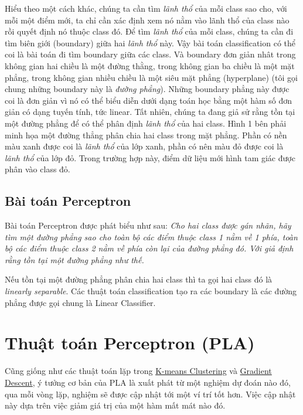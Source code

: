 Hiểu theo một cách khác, chúng ta cần tìm \textit{lãnh thổ} của mỗi class sao cho, với mỗi một điểm mới, ta chỉ cần xác định xem nó nằm vào lãnh thổ của class nào rồi quyết định nó thuộc class đó. Để tìm \textit{lãnh thổ} của mỗi class, chúng ta cần đi tìm biên giới (boundary) giữa hai \textit{lãnh thổ} này. Vậy bài toán classification có thể coi là bài toán đi tìm boundary giữa các class. Và boundary đơn giản nhât trong không gian hai chiều là một đường thằng, trong không gian ba chiều là một mặt phẳng, trong không gian nhiều chiều là một siêu mặt phẳng (hyperplane) (tôi gọi chung những boundary này là \textit{đường phẳng}). Những boundary phẳng này được coi là đơn giản vì nó có thể biểu diễn dưới dạng toán học bằng một hàm số đơn giản có dạng tuyến tính, tức linear. Tất nhiên, chúng ta đang giả sử rằng tồn tại một đường phẳng để có thể phân định \textit{lãnh thổ} của hai class. Hình 1 bên phải minh họa một đường thẳng phân chia hai class trong mặt phẳng. Phần có nền màu xanh được coi là \textit{lãnh thổ} của lớp xanh, phần có nên màu đỏ được coi là \textit{lãnh thổ} của lớp đỏ. Trong trường hợp này, điểm dữ liệu mới hình tam giác được phân vào class đỏ.  
 
 
\subsection{Bài toán Perceptron }
Bài toán Perceptron được phát biểu như sau: \textit{Cho hai class được gán nhãn, hãy tìm một đường phẳng sao cho toàn bộ các điểm thuộc class 1 nằm về 1 phía, toàn bộ các điểm thuộc class 2 nằm về phía còn lại của đường phẳng đó. Với giả định rằng tồn tại một đường phẳng như thế.} 
 
Nếu tồn tại một đường phẳng phân chia hai class thì ta gọi hai class đó là \textit{linearly separable}. Các thuật toán classification tạo ra các boundary là các đường phẳng được gọi chung là Linear Classifier. 
 
 
\section{Thuật toán Perceptron (PLA)}
Cũng giống như các thuật toán lặp trong \href{http://machinelearningcoban.com/2017/01/01/kmeans/}{K-means Clustering} và \href{http://machinelearningcoban.com/2017/01/12/gradientdescent/}{Gradient Descent}, ý tưởng cơ bản của PLA là xuất phát từ một nghiệm dự đoán nào đó, qua mỗi vòng lặp, nghiệm sẽ được cập nhật tới một ví trí tốt hơn. Việc cập nhật này dựa trên việc giảm giá trị của một hàm mất mát nào đó.  
 

